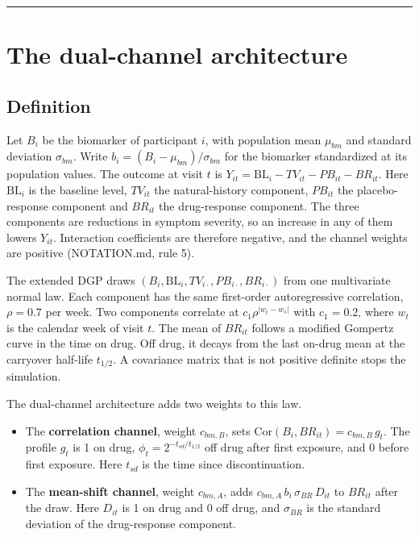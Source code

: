 \documentclass[
  11pt,
]{article}
\providecommand{\tightlist}{%
  \setlength{\itemsep}{0pt}\setlength{\parskip}{0pt}}
\begin{document}
\bigskip\noindent

\rule{\textwidth}{0.4pt}\bigskip

\section{The dual-channel architecture}\label{sec-def}

\subsection{Definition}\label{definition}

Let \(B_i\) be the biomarker of participant \(i\), with population mean
\(\mu_{bm}\) and standard deviation \(\sigma_{bm}\). Write
\(b_i = (B_i - \mu_{bm})/\sigma_{bm}\) for the biomarker standardized
at its population values. The outcome at visit \(t\) is
\(Y_{it} = \mathrm{BL}_i - TV_{it} - PB_{it} - BR_{it}\). Here
\(\mathrm{BL}_i\) is the baseline level, \(TV_{it}\) the natural-history
component, \(PB_{it}\) the placebo-response component and \(BR_{it}\)
the drug-response component. The three components are reductions in
symptom severity, so an increase in any of them lowers \(Y_{it}\).
Interaction coefficients are therefore negative, and the channel
weights are positive (NOTATION.md, rule 5).

The extended DGP draws \((B_i, \mathrm{BL}_i, TV_{i\cdot},
PB_{i\cdot}, BR_{i\cdot})\) from one multivariate normal law. Each
component has the same first-order autoregressive correlation,
\(\rho = 0.7\) per week. Two components correlate at
\(c_1 \rho^{|w_t - w_s|}\) with \(c_1 = 0.2\), where \(w_t\) is the
calendar week of visit \(t\). The mean of \(BR_{it}\) follows a modified
Gompertz curve in the time on drug. Off drug, it decays from the last
on-drug mean at the carryover half-life \(t_{1/2}\). A covariance matrix
that is not positive definite stops the simulation.

The dual-channel architecture adds two weights to this law.

\begin{itemize}
\tightlist
\item
  The \textbf{correlation channel}, weight \(c_{bm,B}\), sets
  \(\mathrm{Cor}(B_i, BR_{it}) = c_{bm,B}\, g_t\). The profile \(g_t\)
  is 1 on drug, \(\phi_t = 2^{-t_{sd}/t_{1/2}}\) off drug after first
  exposure, and 0 before first exposure. Here \(t_{sd}\) is the time
  since discontinuation.
\item
  The \textbf{mean-shift channel}, weight \(c_{bm,A}\), adds
  \(c_{bm,A}\, b_i\, \sigma_{BR}\, D_{it}\) to \(BR_{it}\) after the
  draw. Here \(D_{it}\) is 1 on drug and 0 off drug, and \(\sigma_{BR}\)
  is the standard deviation of the drug-response component.
\end{itemize}
\end{document}
